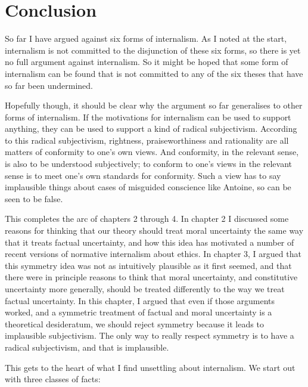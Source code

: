 \section{Conclusion}
\label{conclusion}

So far I have argued against six forms of internalism. As I noted at the start, internalism is not committed to the disjunction of these six forms, so there is yet no full argument against internalism. So it might be hoped that some form of internalism can be found that is not committed to any of the six theses that have so far been undermined.

Hopefully though, it should be clear why the argument so far generalises to other forms of internalism. If the motivations for internalism can be used to support anything, they can be used to support a kind of radical subjectivism. According to this radical subjectivism, rightness, praiseworthiness and rationality are all matters of conformity to one's own views. And conformity, in the relevant sense, is also to be understood subjectively; to conform to one's views in the relevant sense is to meet one's own standards for conformity. Such a view has to say implausible things about cases of misguided conscience like \gls{Antoine}, so can be seen to be false.

This completes the arc of chapters 2 through 4. In chapter 2 I discussed some reasons for thinking that our theory should treat moral uncertainty the same way that it treats factual uncertainty, and how this idea has motivated a number of recent versions of normative internalism about ethics. In chapter 3, I argued that this symmetry idea was not as intuitively plausible as it first seemed, and that there were in principle reasons to think that moral uncertainty, and constitutive uncertainty more generally, should be treated differently to the way we treat factual uncertainty. In this chapter, I argued that even if those arguments worked, and a symmetric treatment of factual and moral uncertainty is a theoretical desideratum, we should reject symmetry because it leads to implausible subjectivism. The only way to really respect symmetry is to have a radical subjectivism, and that is implausible.

This gets to the heart of what I find unsettling about internalism. We start out with three classes of facts:

